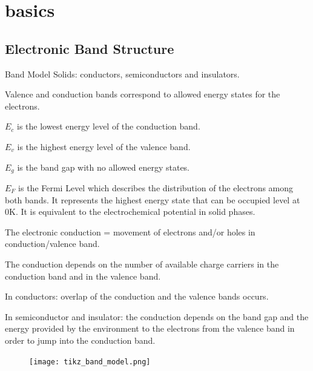 \documentclass[10pt,compress]{beamer}
\begin{document}
\section{basics}
\subsection{Electronic Band Structure}
    \begin{frame}[allowframebreaks=1.0]{Band Model}
        Solids: conductors, semiconductors and insulators. 
        
        Valence and conduction bands correspond to allowed energy states for the electrons. 
        
        $E_c$ is the lowest energy level of the conduction band.
        
        $E_v$ is the highest energy level of the valence band.
        
        $E_g$ is the band gap with no allowed energy states. 
        
        $E_F$ is the Fermi Level which describes the distribution of the electrons among both bands.
        It represents the highest energy state that can be occupied level at 0K. 
        It is equivalent to the electrochemical potential in solid phases.
        
        \framebreak
        The electronic conduction = movement of electrons and/or holes in conduction/valence band.
        
        The conduction depends on the number of available charge carriers
        in the conduction band and in the valence band. 
        
        In conductors: overlap of the conduction and the valence bands occurs. 
        
        In semiconductor and insulator: the conduction depends on the band gap and the energy provided by 
        the environment to the electrons from the valence band in order to jump 
        into the conduction band.

        \begin{figure}[h]
            \centering
                \texttt{[image: tikz\_band\_model.png]}
            \label{fig_band_model}
        \end{figure}
    \end{frame}
\end{document}
